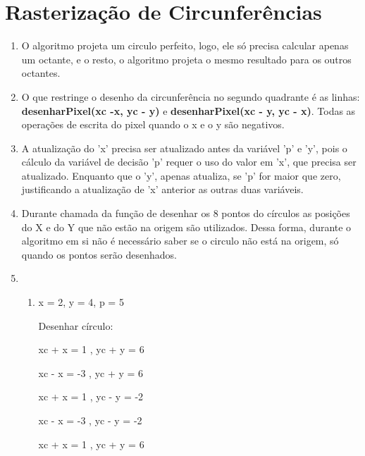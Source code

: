 \section*{Rasterização de Circunferências}

	\begin{enumerate} \addtocounter{enumi}{15}
		\item 
		O algoritmo projeta um circulo perfeito, logo, ele só precisa calcular apenas um
		octante, e o resto, o algoritmo projeta o mesmo resultado para os outros octantes.
		
		\item 
		O que restringe o desenho da circunferência no segundo quadrante é as linhas:
		\textbf{desenharPixel(xc -x, yc - y)} e \textbf{desenharPixel(xc - y, yc - x)}. 
		Todas as operações de	escrita do pixel quando o x e o y são negativos.		
		
		\item 
		A atualização do 'x' precisa ser atualizado antes da variável 'p' e 'y', pois o cálculo
		da variável de decisão 'p' requer o uso do valor em 'x', que precisa ser atualizado. 
		Enquanto que o 'y', apenas atualiza, se 'p' for maior que zero, justificando a atualização
		de 'x' anterior as outras duas variáveis.
		 
		\item 
       Durante chamada da função de desenhar os 8 pontos do círculos as posições do X e do Y 
       que não estão na origem são utilizados. Dessa forma, durante o algoritmo em si não é 
       necessário saber se o circulo não está na origem, só quando os pontos serão desenhados.
       
		\item
		\begin{enumerate}[label=\alph*. ]
			\item 
		
            x = 2, y = 4, p = 5

                Desenhar círculo:
                
                   xc + x = 1 , yc + y = 6
                   
                   xc - x = -3 , yc + y = 6
                   
                   xc + x = 1 , yc - y = -2
                   
                   xc - x = -3 , yc - y = -2
                   
                   xc + x = 1 , yc + y = 6
                   

\end{enumerate}
\end{enumerate}
